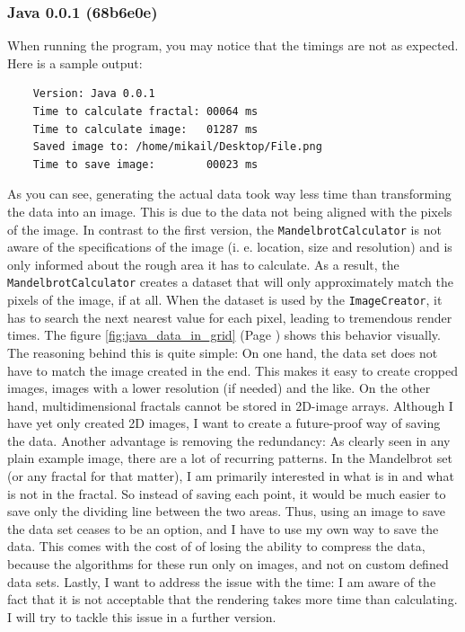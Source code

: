 \documentclass[10pt,a4paper,titlepage]{article}
\begin{document}
	\subsubsection{Java 0.0.1 (68b6e0e)}
	When running the program, you may notice that the timings are not as expected. Here is a sample output:
	\begin{verbatim}
	Version: Java 0.0.1
	Time to calculate fractal: 00064 ms
	Time to calculate image:   01287 ms
	Saved image to: /home/mikail/Desktop/File.png
	Time to save image:        00023 ms
	\end{verbatim}
	As you can see, generating the actual data took way less time than transforming the data into an image. This is due to the data not being aligned with the pixels of the image. In contrast to the first version, the \verb|MandelbrotCalculator| is not aware of the specifications of the image (i. e. location, size and resolution) and is only informed about the rough area it has to calculate. As a result, the \verb|MandelbrotCalculator| creates a dataset that will only approximately match the pixels of the image, if at all. When the dataset is used by the \verb|ImageCreator|, it has to search the next nearest value for each pixel, leading to tremendous render times. The figure \ref{fig:java_data_in_grid} (Page \pageref{fig:java_data_in_grid}) shows this behavior visually.\\
	The reasoning behind this is quite simple: On one hand, the data set does not have to match the image created in the end. This makes it easy to create cropped images, images with a lower resolution (if needed) and the like. On the other hand, multidimensional fractals cannot be stored in 2D-image arrays. Although I have yet only created 2D images, I want to create a future-proof way of saving the data. Another advantage is removing the redundancy: As clearly seen in any plain example image, there are a lot of recurring patterns. In the Mandelbrot set (or any fractal for that matter), I am primarily interested in what is in and what is not in the fractal. So instead of saving each point, it would be much easier to save only the dividing line between the two areas. Thus, using an image to save the data set ceases to be an option, and I have to use my own way to save the data. This comes with the cost of of losing the ability to compress the data, because the algorithms for these run only on images, and not on custom defined data sets. Lastly, I want to address the issue with the time: I am aware of the fact that it is not acceptable that the rendering takes more time than calculating. I will try to tackle this issue in a further version.
\end{document}
